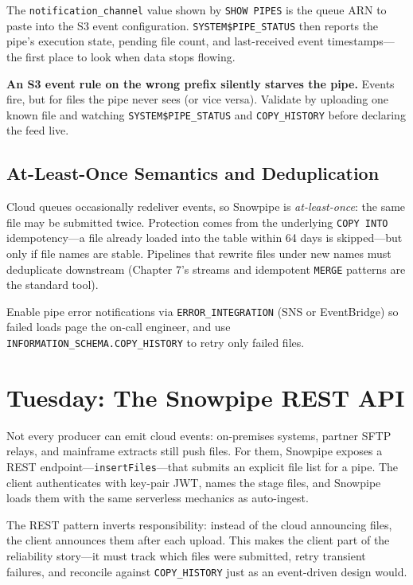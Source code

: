 The \texttt{notification\_channel} value shown by \texttt{SHOW PIPES} is the queue ARN to paste into the S3 event configuration. \texttt{SYSTEM\$PIPE\_STATUS} then reports the pipe's execution state, pending file count, and last-received event timestamps---the first place to look when data stops flowing.

\begin{pitfall}
\textbf{An S3 event rule on the wrong prefix silently starves the pipe.} Events fire, but for files the pipe never sees (or vice versa). Validate by uploading one known file and watching \texttt{SYSTEM\$PIPE\_STATUS} and \texttt{COPY\_HISTORY} before declaring the feed live.
\end{pitfall}

\subsection{At-Least-Once Semantics and Deduplication}
Cloud queues occasionally redeliver events, so Snowpipe is \emph{at-least-once}: the same file may be submitted twice. Protection comes from the underlying \texttt{COPY INTO} idempotency---a file already loaded into the table within 64 days is skipped---but only if file names are stable. Pipelines that rewrite files under new names must deduplicate downstream (Chapter 7's streams and idempotent \texttt{MERGE} patterns are the standard tool).

\begin{notebox}
Enable pipe error notifications via \texttt{ERROR\_INTEGRATION} (SNS or EventBridge) so failed loads page the on-call engineer, and use \texttt{INFORMATION\_SCHEMA.COPY\_HISTORY} to retry only failed files.
\end{notebox}

\section{Tuesday: The Snowpipe REST API}
Not every producer can emit cloud events: on-premises systems, partner SFTP relays, and mainframe extracts still push files. For them, Snowpipe exposes a REST endpoint---\texttt{insertFiles}---that submits an explicit file list for a pipe. The client authenticates with key-pair JWT, names the stage files, and Snowpipe loads them with the same serverless mechanics as auto-ingest.

The REST pattern inverts responsibility: instead of the cloud announcing files, the client announces them after each upload. This makes the client part of the reliability story---it must track which files were submitted, retry transient failures, and reconcile against \texttt{COPY\_HISTORY} just as an event-driven design would.

